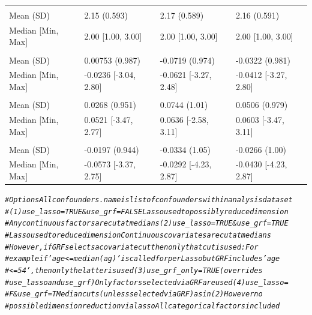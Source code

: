 \documentclass[smallextended]{svjour3}
\makeatletter
\newcommand{\hlcom}[1]{\textcolor[rgb]{0.678,0.584,0.686}{\textit{#1}}}%
\newenvironment{kframe}{%
 \def\at@end@of@kframe{}%
 \ifinner\ifhmode%
  \def\at@end@of@kframe{\end{minipage}}%
  \begin{minipage}{\columnwidth}%
 \fi\fi%
 \def\FrameCommand##1{\hskip\@totalleftmargin \hskip-\fboxsep
 \colorbox{shadecolor}{##1}\hskip-\fboxsep
     \hskip-\linewidth \hskip-\@totalleftmargin \hskip\columnwidth}%
 \MakeFramed {\advance\hsize-\width
   \@totalleftmargin\z@ \linewidth\hsize
   \@setminipage}}%
 {\par\unskip\endMakeFramed%
 \at@end@of@kframe}
\newenvironment{knitrout}{}{} %
\makeatother
\begin{document}
\begin{knitrout}
\begin{tabular}[t]{llll}
\addlinespace[0.3em]
\multicolumn{4}{l}{\textbf{grade}}\\
\hspace{1em}Mean (SD) & 2.15 (0.593) & 2.17 (0.589) & 2.16 (0.591)\\
\hspace{1em}Median [Min, Max] & 2.00 [1.00, 3.00] & 2.00 [1.00, 3.00] & 2.00 [1.00, 3.00]\\
\addlinespace[0.3em]
\multicolumn{4}{l}{\textbf{noise1}}\\
\hspace{1em}Mean (SD) & 0.00753 (0.987) & -0.0719 (0.974) & -0.0322 (0.981)\\
\hspace{1em}Median [Min, Max] & -0.0236 [-3.04, 2.80] & -0.0621 [-3.27, 2.48] & -0.0412 [-3.27, 2.80]\\
\addlinespace[0.3em]
\multicolumn{4}{l}{\textbf{noise2}}\\
\hspace{1em}Mean (SD) & 0.0268 (0.951) & 0.0744 (1.01) & 0.0506 (0.979)\\
\hspace{1em}Median [Min, Max] & 0.0521 [-3.47, 2.77] & 0.0636 [-2.58, 3.11] & 0.0603 [-3.47, 3.11]\\
\addlinespace[0.3em]
\multicolumn{4}{l}{\textbf{noise3}}\\
\hspace{1em}Mean (SD) & -0.0197 (0.944) & -0.0334 (1.05) & -0.0266 (1.00)\\
\hspace{1em}Median [Min, Max] & -0.0573 [-3.37, 2.75] & -0.0292 [-4.23, 2.87] & -0.0430 [-4.23, 2.87]\\
\bottomrule
\end{tabular}

\begin{kframe}\begin{alltt}
\hlcom{# Options Allconfounders.name is list of confounders within analysis dataset}
\hlcom{# (1) use_lasso=TRUE & use_grf=FALSE Lasso used to possibly reduce dimension}
\hlcom{# Any continuous factors are cut at medians (2) use_lasso=TRUE & use_grf=TRUE}
\hlcom{# Lasso used to reduce dimension Continuous covariates are cut at medians}
\hlcom{# However, if GRF selects a covariate cut then only that cut is used: For}
\hlcom{# example if 'age <= median(ag)' is called for per Lasso but GRF includes 'age}
\hlcom{# <= 54', then only the latter is used (3) use_grf_only = TRUE (overrides}
\hlcom{# use_lasso and use_grf) Only factors selected via GRF are used (4) use_lasso =}
\hlcom{# F & use_grf =T Median cuts (unless selected via GRF) as in (2) However no}
\hlcom{# possible dimension reduction via lasso All categorical factors included}


\end{alltt}
\end{kframe}
\end{knitrout}
\end{document}
